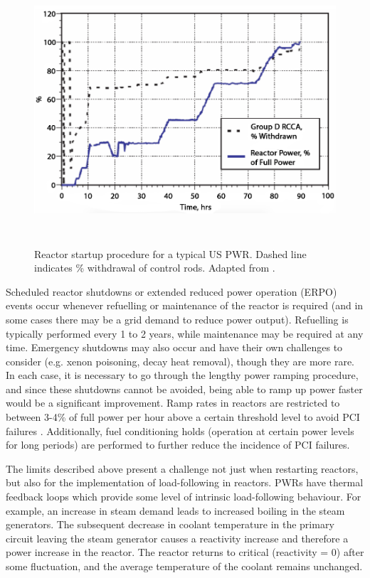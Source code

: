\begin{figure}[ht]
\centering
\includegraphics[height=10cm]{images/reactor_startup.png}
\caption[Reactor startup procedure for a typical US PWR. Dashed line indicates \% withdrawal of control rods.]{Reactor startup procedure for a typical US PWR. Dashed line indicates \% withdrawal of control rods. Adapted from \cite{ramping}.}
\label{figure:reactor_startup}
\end{figure}

Scheduled reactor shutdowns or extended reduced power operation (ERPO) events occur whenever refuelling or maintenance of the reactor is required (and in some cases there may be a grid demand to reduce power output).  Refuelling is typically performed every 1 to 2 years, while maintenance may be required at any time. Emergency shutdowns may also occur and have their own challenges to consider (e.g. xenon poisoning, decay heat removal), though they are more rare. In each case, it is necessary to go through the lengthy power ramping procedure, and since these shutdowns cannot be avoided, being able to ramp up power faster would be a significant improvement. Ramp rates in reactors are restricted to between 3-4\% of full power per hour above a certain threshold level to avoid PCI failures \cite{ramping}. Additionally, fuel conditioning holds (operation at certain power levels for long periods) are performed to further reduce the incidence of PCI failures. 

The limits described above present a challenge not just when restarting reactors, but also for the implementation of load-following in reactors. PWRs have thermal feedback loops which provide some level of intrinsic load-following behaviour. For example, an increase in steam demand leads to increased boiling in the steam generators. The subsequent decrease in coolant temperature in the primary circuit leaving the steam generator causes a reactivity increase and therefore a power increase in the reactor. The reactor returns to critical (reactivity = 0) after some fluctuation, and the average temperature of the coolant remains unchanged.

